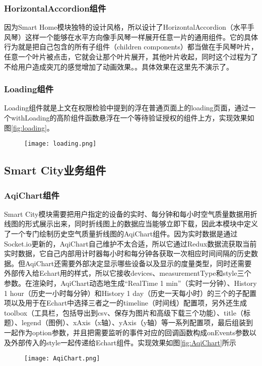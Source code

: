 \subsubsection{HorizontalAccordion组件}
因为Smart Home模块独特的设计风格，所以设计了HorizontalAccordion（水平手风琴）这样一个能够在水平方向像手风琴一样展开任意一片的通用组件。它的具体行为就是把自己包含的所有子组件（children components）都当做在手风琴叶片，任意一个叶片被点击，它就会让那个叶片展开，其他叶片收起，同时这个过程为了不给用户造成突兀的感觉增加了动画效果。。具体效果在这里先不演示了。
\subsubsection{Loading组件}
Loading组件就是上文在权限检验中提到的浮在普通页面上的loading页面，通过一个withLoading的高阶组件函数悬浮在一个等待验证授权的组件上方，实现效果如图\ref{fig:loading}。
\begin{figure}[!htp]
 \centering
 \texttt{[image: loading.png]}
\end{figure}
\subsection{Smart City业务组件}
\subsubsection{AqiChart组件}
Smart City模块需要把用户指定的设备的实时、每分钟和每小时空气质量数据用折线图的形式展示出来，同时折线图上的数据应当能够立即下载，因此本模块中定义了一个专门绘制历史空气质量折线图的AqiChart组件。因为实时数据是通过Socket.io更新的，AqiChart自己维护不太合适，所以它通过Redux数据流获取当前实时数据，它自己内部用计时器每小时和每分钟各获取一次相应时间间隔的历史数据。但AqiChart还需要外部决定显示哪些设备以及显示的度量类型，同时还需要外部传入给Echart用的样式，所以它接收devices、measurementType和style三个参数。在渲染时，AqiChart动态地生成“RealTime 1 min”（实时一分钟）、History 1 hour（历史一小时每分钟）和History 1 day（历史一天每小时）的三个的子配置项以及用于在Echart中选择三者之一的timeline（时间线）配置项，另外还生成toolbox（工具栏，包括导出到csv、保存为图片和高级下载三个功能）、title（标题）、legend（图例）、xAxis（x轴）、yAxis（y轴）等一系列配置项，最后组装到一起作为option参数，并且把需要监听的事件对应的回调函数构成onEvents参数以及外部传入的style一起传递给Echart组件。实现效果如图\ref{fig:AqiChart}所示
\begin{figure}[!htp]
 \centering
 \texttt{[image: AqiChart.png]}
\end{figure}
